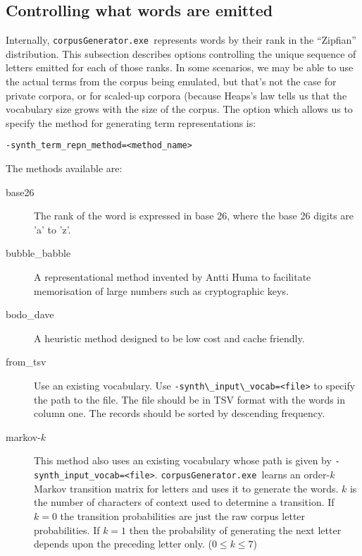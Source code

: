 \documentclass{article}
\newcommand{\gac}{\texttt{corpusGenerator.exe~}}
\begin{document}
\subsection{Controlling what words are emitted}
Internally, \gac represents words by their rank in the ``Zipfian''
distribution. This subsection describes options controlling the unique
sequence of letters emitted for each of those ranks.  In some
scenarios, we may be able to use the actual terms from the corpus
being emulated, but that's not the case for private corpora, or for
scaled-up corpora (because Heaps's law tells us that the vocabulary
size grows with the size of the corpus.  The option which allows us to
specify the method for generating term representations is:
\begin{verbatim}
-synth_term_repn_method=<method_name>
\end{verbatim}
The methods available are:
\begin{description}
  \item[base26] The rank of the word is expressed in base 26, where
    the base 26 digits are 'a' to 'z'.
  \item[bubble\_babble] A representational method invented by Antti
    Huma to facilitate memorisation of large numbers such as
    cryptographic keys.
  \item[bodo\_dave] A heuristic method designed to be low cost and
    cache friendly.
  \item[from\_tsv]Use an existing vocabulary.  Use
    \verb|-synth\_input\_vocab=<file>| to specify the path to the file.
    The file should be in TSV format with the words in column one.
    The records should be sorted by descending frequency.
  \item[markov-$k$]This method also uses an existing vocabulary
    whose path is given by \verb|-synth_input_vocab=<file>|.
    \gac learns an order-$k$ Markov transition matrix for letters and uses
    it to generate the words.  $k$ is the number of characters of
    context used to determine a transition.  If $k=0$ the transition
    probabilities are just the raw corpus letter probabilities.  If
    $k=1$ then the probability of generating the next letter depends
    upon the preceding letter only.  ($0 \le k \le 7$)
\end{description}
\end{document}
